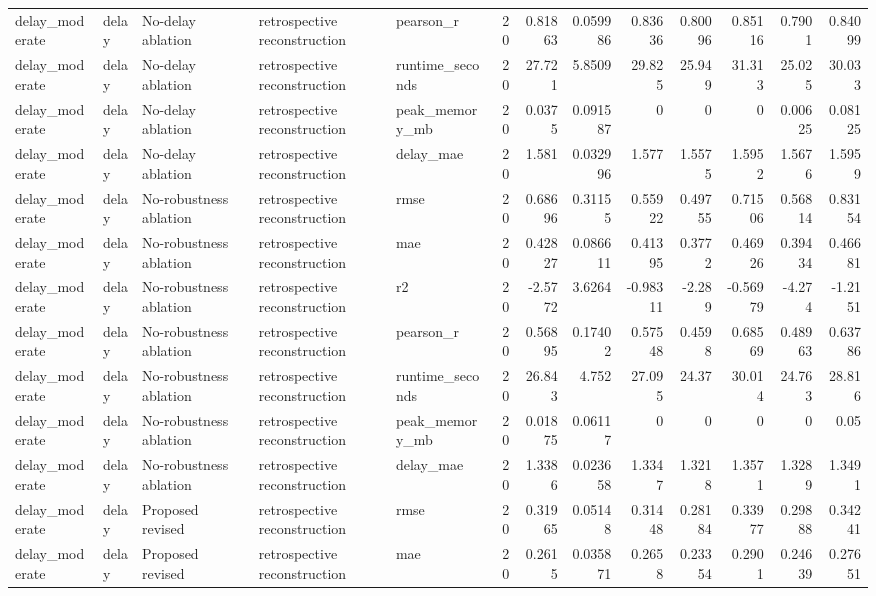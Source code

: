 \begin{table}[!htbp]
{{\begin{tabular}{lllllrrrrrrrr}
delay_moderate & delay & No-delay ablation & retrospective reconstruction & pearson_r & 20 & 0.81863 & 0.059986 & 0.83636 & 0.80096 & 0.85116 & 0.7901 & 0.84099 \\
delay_moderate & delay & No-delay ablation & retrospective reconstruction & runtime_seconds & 20 & 27.721 & 5.8509 & 29.825 & 25.949 & 31.313 & 25.025 & 30.033 \\
delay_moderate & delay & No-delay ablation & retrospective reconstruction & peak_memory_mb & 20 & 0.0375 & 0.091587 & 0 & 0 & 0 & 0.00625 & 0.08125 \\
delay_moderate & delay & No-delay ablation & retrospective reconstruction & delay_mae & 20 & 1.581 & 0.032996 & 1.577 & 1.5575 & 1.5952 & 1.5676 & 1.5959 \\
delay_moderate & delay & No-robustness ablation & retrospective reconstruction & rmse & 20 & 0.68696 & 0.31155 & 0.55922 & 0.49755 & 0.71506 & 0.56814 & 0.83154 \\
delay_moderate & delay & No-robustness ablation & retrospective reconstruction & mae & 20 & 0.42827 & 0.086611 & 0.41395 & 0.3772 & 0.46926 & 0.39434 & 0.46681 \\
delay_moderate & delay & No-robustness ablation & retrospective reconstruction & r2 & 20 & -2.5772 & 3.6264 & -0.98311 & -2.289 & -0.56979 & -4.274 & -1.2151 \\
delay_moderate & delay & No-robustness ablation & retrospective reconstruction & pearson_r & 20 & 0.56895 & 0.17402 & 0.57548 & 0.4598 & 0.68569 & 0.48963 & 0.63786 \\
delay_moderate & delay & No-robustness ablation & retrospective reconstruction & runtime_seconds & 20 & 26.843 & 4.752 & 27.095 & 24.37 & 30.014 & 24.763 & 28.816 \\
delay_moderate & delay & No-robustness ablation & retrospective reconstruction & peak_memory_mb & 20 & 0.01875 & 0.06117 & 0 & 0 & 0 & 0 & 0.05 \\
delay_moderate & delay & No-robustness ablation & retrospective reconstruction & delay_mae & 20 & 1.3386 & 0.023658 & 1.3347 & 1.3218 & 1.3571 & 1.3289 & 1.3491 \\
delay_moderate & delay & Proposed revised & retrospective reconstruction & rmse & 20 & 0.31965 & 0.05148 & 0.31448 & 0.28184 & 0.33977 & 0.29888 & 0.34241 \\
delay_moderate & delay & Proposed revised & retrospective reconstruction & mae & 20 & 0.2615 & 0.035871 & 0.2658 & 0.23354 & 0.2901 & 0.24639 & 0.27651 \\

\end{tabular}}}
\end{table}
